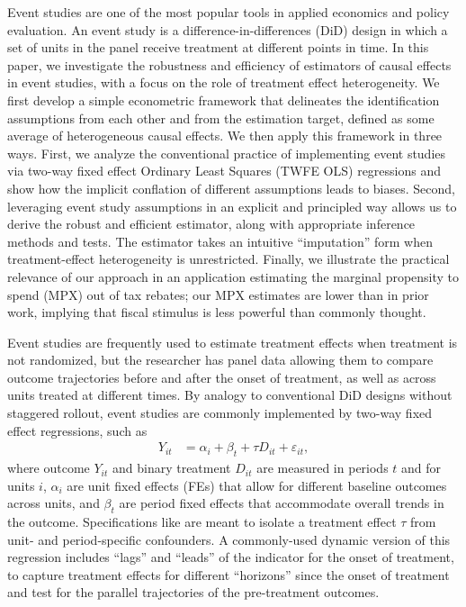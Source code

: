 \documentclass[english,11pt]{article}
\theoremstyle{plain}
\theoremstyle{plain}
\theoremstyle{plain}
\theoremstyle{plain}
\let\ref\Cref
\begin{document}
Event studies are one of the most popular tools in applied economics
and policy evaluation. An event study is a difference-in-differences
(DiD) design in which a set of units in the panel receive treatment
at different points in time. In this paper, we investigate the robustness
and efficiency of estimators of causal effects in event studies, with
a focus on the role of treatment effect heterogeneity. We first develop
a simple econometric framework that delineates the identification
assumptions from each other and from the estimation target, defined
as some average of heterogeneous causal effects. We then apply this
framework in three ways. First, we analyze the conventional practice
of implementing event studies via two-way fixed effect Ordinary Least
Squares (TWFE OLS) regressions and show how the implicit conflation
of different assumptions leads to biases. Second, leveraging event
study assumptions in an explicit and principled way allows us to derive
the robust and efficient estimator, along with appropriate inference
methods and tests. The estimator takes an intuitive ``imputation''
form when treatment-effect heterogeneity is unrestricted. Finally,
we illustrate the practical relevance of our approach in an application
estimating the marginal propensity to spend (MPX) out of tax rebates;
our MPX estimates are lower than in prior work, implying that fiscal
stimulus is less powerful than commonly thought.

Event studies are frequently used to estimate treatment effects when
treatment is not randomized, but the researcher has panel data allowing
them to compare outcome trajectories before and after the onset of
treatment, as well as across units treated at different times. By
analogy to conventional DiD designs without staggered rollout, event
studies are commonly implemented by two-way fixed effect regressions,
such as
\begin{align}
Y_{it} & =\alpha_{i}+\beta_{t}+\tau D_{it}+\varepsilon_{it},\label{eq:baselineTEmodel}
\end{align}
where outcome $Y_{it}$ and binary treatment $D_{it}$ are measured
in periods $t$ and for units $i$, $\alpha_{i}$ are unit fixed effects
(FEs) that allow for different baseline outcomes across units, and
$\beta_{t}$ are period fixed effects that accommodate overall trends
in the outcome. Specifications like \ref{eq:baselineTEmodel} are
meant to isolate a treatment effect $\tau$ from unit- and period-specific
confounders. A commonly-used dynamic version of this regression includes
``lags'' and ``leads'' of the indicator for the onset of treatment,
to capture treatment effects for different ``horizons'' since the
onset of treatment and test for the parallel trajectories of the pre-treatment
outcomes.
\end{document}
